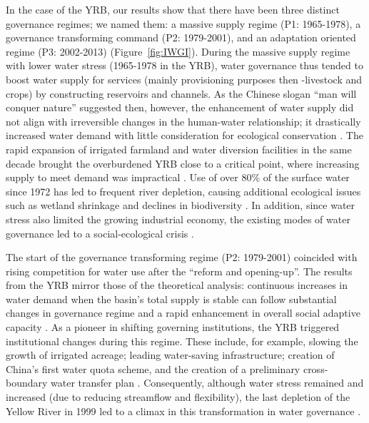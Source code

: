 In the case of the YRB, our results show that there have been three distinct governance regimes; we named them: a massive supply regime (P1: 1965-1978), a governance transforming command (P2: 1979-2001), and an adaptation oriented regime (P3: 2002-2013) (Figure~\ref{fig:IWGI}).
During the massive supply regime with lower water stress (1965-1978 in the YRB), water governance thus tended to boost water supply for services (mainly provisioning purposes then -livestock and crops) by constructing reservoirs and channels.
As the Chinese slogan ``man will conquer nature'' suggested then, however, the enhancement of water supply did not align with irreversible changes in the human-water relationship; it drastically increased water demand with little consideration for ecological conservation
\cite{zhou2020}.
The rapid expansion of irrigated farmland and water diversion facilities in the same decade brought the overburdened YRB close to a critical point, where increasing supply to meet demand was impractical \cite{loch2020}.
Use of over $80\%$ of the surface water since 1972 has led to frequent river depletion, causing additional ecological issues such as wetland shrinkage and declines in biodiversity \cite{wang2019c}.
In addition, since water stress also limited the growing industrial economy, the existing modes of water governance led to a social-ecological crisis
\cite{wohlfart2016a}.

The start of the governance transforming regime (P2: 1979-2001) coincided with rising competition for water use after the ``reform and opening-up''.
The results from the YRB mirror those of the theoretical analysis: continuous increases in water demand when the basin's total supply is stable can follow substantial changes in governance regime and a rapid enhancement in overall social adaptive capacity \cite{loch2020}.
As a pioneer in shifting governing institutions, the YRB triggered institutional changes during this regime. These include, for example, slowing the growth of irrigated acreage; leading water-saving infrastructure; creation of China's first water quota scheme, and the creation of a preliminary cross-boundary water transfer plan
\cite{wang2019a,long2020,nickum2021}.
Consequently, although water stress remained and increased (due to reducing streamflow and flexibility), the last depletion of the Yellow River in 1999 led to a climax in this transformation in water governance \cite{wang2019a}.

